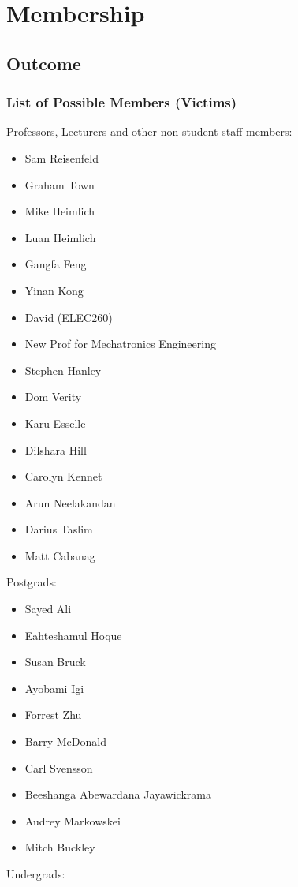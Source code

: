 \section{Membership}
\label{sec:Membership}
\subsection{Outcome}
\subsubsection{List of Possible Members (Victims)}
Professors, Lecturers and other non-student staff members:
\begin{itemize}
  \item Sam Reisenfeld
  \item Graham Town
  \item Mike Heimlich
  \item Luan Heimlich
  \item Gangfa Feng
  \item Yinan Kong
  \item David (ELEC260)
  \item New Prof for Mechatronics Engineering
  \item Stephen Hanley
  \item Dom Verity
  \item Karu Esselle
  \item Dilshara Hill
  \item Carolyn Kennet
  \item Arun Neelakandan
  \item Darius Taslim
  \item Matt Cabanag
\end{itemize}
Postgrads:
\begin{itemize}
  \item Sayed Ali
  \item Eahteshamul Hoque
  \item Susan Bruck
  \item Ayobami Igi
  \item Forrest Zhu
  \item Barry McDonald
  \item Carl Svensson
  \item Beeshanga Abewardana Jayawickrama
  \item Audrey Markowskei
  \item Mitch Buckley
\end{itemize}
Undergrads:
